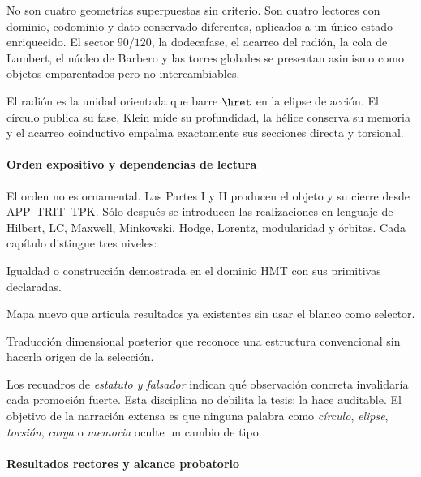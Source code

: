 No son cuatro geometrías superpuestas sin criterio. Son cuatro lectores con
dominio, codominio y dato conservado diferentes, aplicados a un único estado
enriquecido. El sector \(90/120\), la dodecafase, el acarreo del radión, la cola
de Lambert, el núcleo de Barbero y las torres globales se presentan asimismo
como objetos emparentados pero no intercambiables.

\begin{thesisbox}
El radión es la unidad orientada que barre \(\hret\) en la elipse de acción.
El círculo publica su fase, Klein mide su profundidad, la hélice conserva su
memoria y el acarreo coinductivo empalma exactamente sus secciones directa y
torsional.
\end{thesisbox}

\paragraph{Orden expositivo y dependencias de lectura}

El orden no es ornamental. Las Partes I y II producen el objeto y su cierre
desde APP--TRIT--TPK. Sólo después se introducen las realizaciones en lenguaje
de Hilbert, LC, Maxwell, Minkowski, Hodge, Lorentz, modularidad y órbitas. Cada
capítulo distingue tres niveles:

\begin{description}[style=nextline,leftmargin=4.2cm,labelwidth=3.9cm]
\item[Resultado interno.] Igualdad o construcción demostrada en el dominio
HMT con sus primitivas declaradas.
\item[Formalización reunida.] Mapa nuevo que articula resultados ya existentes
sin usar el blanco como selector.
\item[Interfaz física.] Traducción dimensional posterior que reconoce una
estructura convencional sin hacerla origen de la selección.
\end{description}

Los recuadros de \emph{estatuto y falsador} indican qué observación concreta
invalidaría cada promoción fuerte. Esta disciplina no debilita la tesis; la
hace auditable. El objetivo de la narración extensa es que ninguna palabra
como \emph{círculo}, \emph{elipse}, \emph{torsión}, \emph{carga} o
\emph{memoria} oculte un cambio de tipo.

\paragraph{Resultados rectores y alcance probatorio}

